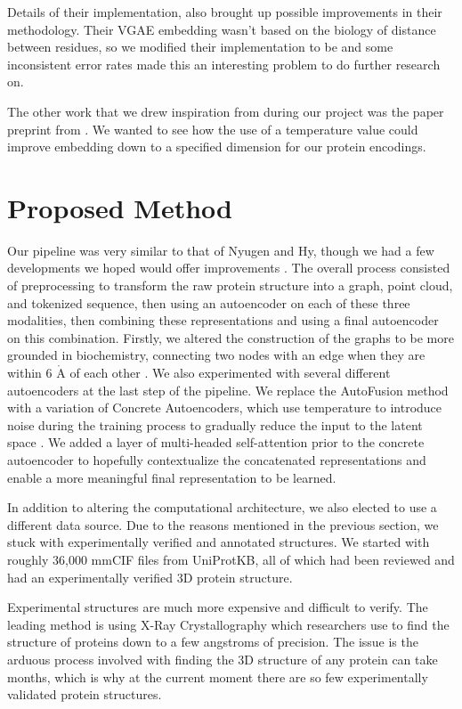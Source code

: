 \documentclass{article}
\begin{document}
Details of their implementation, also brought up possible improvements in their methodology. Their VGAE embedding wasn’t based on the biology of distance between residues, so we modified their implementation to be and some inconsistent error rates made this an interesting problem to do further research on.

The other work that we drew inspiration from during our project was the paper preprint from \cite{abid_2019}. We wanted to see how the use of a temperature value could improve embedding down to a specified dimension for our protein encodings. 

\section{Proposed Method}
\label{sec:proposed_method}
Our pipeline was very similar to that of Nyugen and Hy, though we had a few developments we hoped would offer improvements \cite{nguyen_2024}. The overall process consisted of preprocessing to transform the raw protein structure into a graph, point cloud, and tokenized sequence, then using an autoencoder on each of these three modalities, then combining these representations and using a final autoencoder on this combination. Firstly, we altered the construction of the graphs to be more grounded in biochemistry, connecting two nodes with an edge when they are within 6 $\mathring {\mathrm A}$ of each other \cite{sherva}. We also experimented with several different autoencoders at the last step of the pipeline. We replace the AutoFusion method with a variation of Concrete Autoencoders, which use temperature to introduce noise during the training process to gradually reduce the input to the latent space \cite{abid_2019}. We added a layer of multi-headed self-attention prior to the concrete autoencoder to hopefully contextualize the concatenated representations and enable a more meaningful final representation to be learned.

In addition to altering the computational architecture, we also elected to use a different data source. Due to the reasons mentioned in the previous section, we stuck with experimentally verified and annotated structures. We started with roughly 36,000 mmCIF files from UniProtKB, all of which had been reviewed and had an experimentally verified 3D protein structure. 

Experimental structures are much more expensive and difficult to verify. The leading method is using X-Ray Crystallography which researchers use to find the structure of proteins down to a few angstroms of precision. The issue is the arduous process involved with finding the 3D structure of any protein can take months, which is why at the current moment there are so few experimentally validated protein structures.
\end{document}
